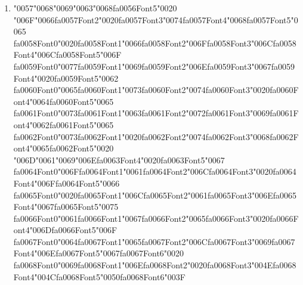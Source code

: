 \documentclass[11pt]{article}
\begin{document}
\begin{enumerate}[label=Q\arabic*., leftmargin=*]
\item {\char"0057}{\char"0068}{\char"0069}{\char"0063}{\char"0068}{\csname fa0056Font5\endcsname\char"0020} {\char"006F}{\char"0066}{\csname fa0057Font2\endcsname\char"0020}{\csname fa0057Font3\endcsname\char"0074}{\csname fa0057Font4\endcsname\char"0068}{\csname fa0057Font5\endcsname\char"0065} {\csname fa0058Font0\endcsname\char"0020}{\csname fa0058Font1\endcsname\char"0066}{\csname fa0058Font2\endcsname\char"006F}{\csname fa0058Font3\endcsname\char"006C}{\csname fa0058Font4\endcsname\char"006C}{\csname fa0058Font5\endcsname\char"006F} {\csname fa0059Font0\endcsname\char"0077}{\csname fa0059Font1\endcsname\char"0069}{\csname fa0059Font2\endcsname\char"006E}{\csname fa0059Font3\endcsname\char"0067}{\csname fa0059Font4\endcsname\char"0020}{\csname fa0059Font5\endcsname\char"0062} {\csname fa0060Font0\endcsname\char"0065}{\csname fa0060Font1\endcsname\char"0073}{\csname fa0060Font2\endcsname\char"0074}{\csname fa0060Font3\endcsname\char"0020}{\csname fa0060Font4\endcsname\char"0064}{\csname fa0060Font5\endcsname\char"0065} {\csname fa0061Font0\endcsname\char"0073}{\csname fa0061Font1\endcsname\char"0063}{\csname fa0061Font2\endcsname\char"0072}{\csname fa0061Font3\endcsname\char"0069}{\csname fa0061Font4\endcsname\char"0062}{\csname fa0061Font5\endcsname\char"0065} {\csname fa0062Font0\endcsname\char"0073}{\csname fa0062Font1\endcsname\char"0020}{\csname fa0062Font2\endcsname\char"0074}{\csname fa0062Font3\endcsname\char"0068}{\csname fa0062Font4\endcsname\char"0065}{\csname fa0062Font5\endcsname\char"0020} {\char"006D}{\char"0061}{\char"0069}{\char"006E}{\csname fa0063Font4\endcsname\char"0020}{\csname fa0063Font5\endcsname\char"0067} {\csname fa0064Font0\endcsname\char"006F}{\csname fa0064Font1\endcsname\char"0061}{\csname fa0064Font2\endcsname\char"006C}{\csname fa0064Font3\endcsname\char"0020}{\csname fa0064Font4\endcsname\char"006F}{\csname fa0064Font5\endcsname\char"0066} {\csname fa0065Font0\endcsname\char"0020}{\csname fa0065Font1\endcsname\char"006C}{\csname fa0065Font2\endcsname\char"0061}{\csname fa0065Font3\endcsname\char"006E}{\csname fa0065Font4\endcsname\char"0067}{\csname fa0065Font5\endcsname\char"0075} {\csname fa0066Font0\endcsname\char"0061}{\csname fa0066Font1\endcsname\char"0067}{\csname fa0066Font2\endcsname\char"0065}{\csname fa0066Font3\endcsname\char"0020}{\csname fa0066Font4\endcsname\char"006D}{\csname fa0066Font5\endcsname\char"006F} {\csname fa0067Font0\endcsname\char"0064}{\csname fa0067Font1\endcsname\char"0065}{\csname fa0067Font2\endcsname\char"006C}{\csname fa0067Font3\endcsname\char"0069}{\csname fa0067Font4\endcsname\char"006E}{\csname fa0067Font5\endcsname\char"0067}{\csname fa0067Font6\endcsname\char"0020} {\csname fa0068Font0\endcsname\char"0069}{\csname fa0068Font1\endcsname\char"006E}{\csname fa0068Font2\endcsname\char"0020}{\csname fa0068Font3\endcsname\char"004E}{\csname fa0068Font4\endcsname\char"004C}{\csname fa0068Font5\endcsname\char"0050}{\csname fa0068Font6\endcsname\char"003F}


\end{enumerate}
\end{document}
